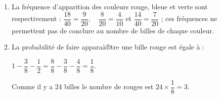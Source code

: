 
\bigskip 

\begin{enumerate}
\item 

% 
%
% 
La fréquence d'apparition des couleurs rouge, bleue et verte sont respectivement : $\dfrac{18}{40} = \dfrac{9}{20}, \quad \dfrac{8}{20} = \dfrac{4}{10}$ et $\dfrac{14}{40} = \dfrac{7}{20}$ ; ces fréquences ne permettent pas de conclure au nombre de billes de chaque couleur.
\item %

La probabilité de faire apparaà®tre une bille rouge est égale à  :

$1 - \dfrac{3}{8} - \dfrac{1}{2} = \dfrac{8}{8} - \dfrac{3}{8} - \dfrac{4}{8} = \dfrac{1}{8}$.

Comme il y a 24 billes le nombre de rouges est $24 \times \dfrac{1}{8} = 3$. 
\end{enumerate}

\bigskip
 
